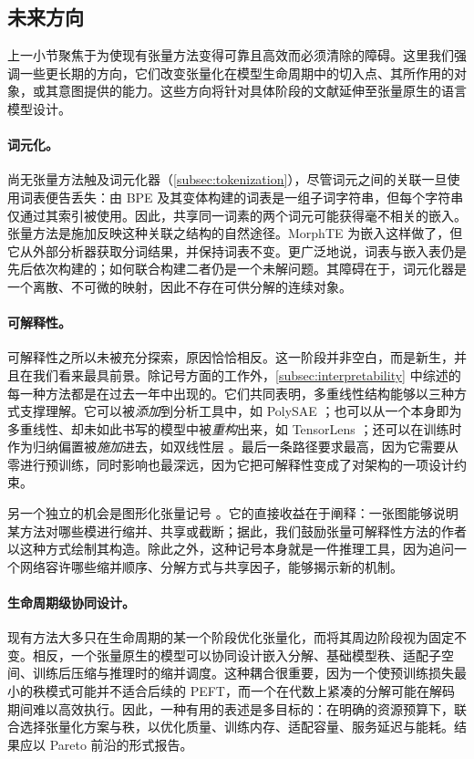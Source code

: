 \subsection{未来方向}

上一小节聚焦于为使现有张量方法变得可靠且高效而必须清除的障碍。这里我们强调一些更长期的方向，它们改变张量化在模型生命周期中的切入点、其所作用的对象，或其意图提供的能力。这些方向将针对具体阶段的文献延伸至张量原生的语言模型设计。

\paragraph{词元化。} 

尚无张量方法触及词元化器（\cref{subsec:tokenization}），尽管词元之间的关联一旦使用词表便告丢失：由 BPE 及其变体构建的词表是一组子词字符串，但每个字符串仅通过其索引被使用。因此，共享同一词素的两个词元可能获得毫不相关的嵌入。张量方法是施加反映这种关联之结构的自然途径。MorphTE \cite{gan2022morphte} 为嵌入这样做了，但它从外部分析器获取分词结果，并保持词表不变。更广泛地说，词表与嵌入表仍是先后依次构建的；如何联合构建二者仍是一个未解问题。其障碍在于，词元化器是一个离散、不可微的映射，因此不存在可供分解的连续对象。

\paragraph{可解释性。}
可解释性之所以未被充分探索，原因恰恰相反。这一阶段并非空白，而是新生，并且在我们看来最具前景。除记号方面的工作外，\cref{subsec:interpretability} 中综述的每一种方法都是在过去一年中出现的。它们共同表明，多重线性结构能够以三种方式支撑理解。它可以被\emph{添加}到分析工具中，如 PolySAE \cite{koromilas2026polysae}；也可以从一个本身即为多重线性、却未如此书写的模型中被\emph{重构}出来，如 TensorLens \cite{atad2026tensorlens}；还可以在训练时作为归纳偏置被\emph{施加}进去，如双线性层 \cite{pearce2025bilinearmlp}。最后一条路径要求最高，因为它需要从零进行预训练，同时影响也最深远，因为它把可解释性变成了对架构的一项设计约束。

另一个独立的机会是图形化张量记号 \cite{taylor2024interpretabilitysurvey4}。它的直接收益在于阐释：一张图能够说明某方法对哪些模进行缩并、共享或截断；据此，我们鼓励张量可解释性方法的作者以这种方式绘制其构造。除此之外，这种记号本身就是一件推理工具，因为追问一个网络容许哪些缩并顺序、分解方式与共享因子，能够揭示新的机制。

\paragraph{生命周期级协同设计。}
现有方法大多只在生命周期的某一个阶段优化张量化，而将其周边阶段视为固定不变。相反，一个张量原生的模型可以协同设计嵌入分解、基础模型秩、适配子空间、训练后压缩与推理时的缩并调度。这种耦合很重要，因为一个使预训练损失最小的秩模式可能并不适合后续的 PEFT，而一个在代数上紧凑的分解可能在解码期间难以高效执行。因此，一种有用的表述是多目标的：在明确的资源预算下，联合选择张量化方案与秩，以优化质量、训练内存、适配容量、服务延迟与能耗。结果应以 Pareto 前沿的形式报告。

